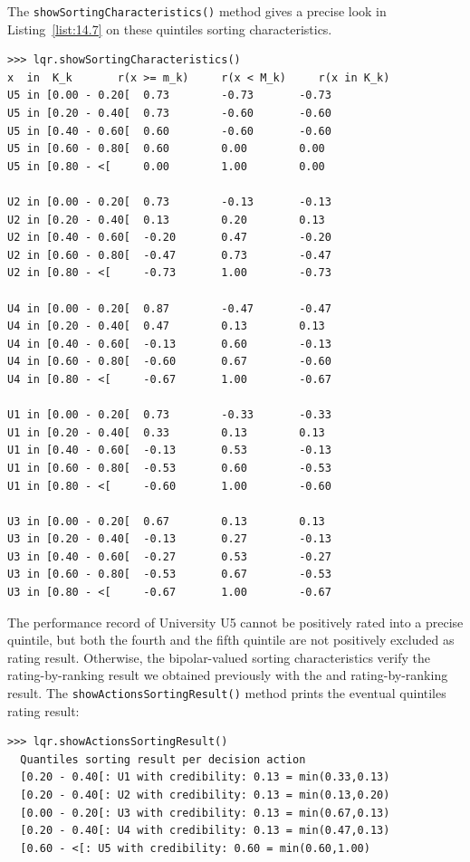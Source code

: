 The \texttt{showSortingCharacteristics()} method gives a precise look in Listing~\vref{list:14.7} on these quintiles sorting characteristics.
\begin{lstlisting}[caption={Showing quantiles sorting characteristics},label=list:14.7,basicstyle=\ttfamily\scriptsize]
>>> lqr.showSortingCharacteristics()
x  in  K_k	     r(x >= m_k)     r(x < M_k)	    r(x in K_k)
U5 in [0.00 - 0.20[	 0.73		 -0.73		 -0.73
U5 in [0.20 - 0.40[	 0.73		 -0.60		 -0.60
U5 in [0.40 - 0.60[	 0.60		 -0.60		 -0.60
U5 in [0.60 - 0.80[	 0.60		 0.00		 0.00
U5 in [0.80 - <[	 0.00		 1.00		 0.00

U2 in [0.00 - 0.20[	 0.73		 -0.13		 -0.13
U2 in [0.20 - 0.40[	 0.13		 0.20		 0.13
U2 in [0.40 - 0.60[	 -0.20		 0.47		 -0.20
U2 in [0.60 - 0.80[	 -0.47		 0.73		 -0.47
U2 in [0.80 - <[	 -0.73		 1.00		 -0.73

U4 in [0.00 - 0.20[	 0.87		 -0.47		 -0.47
U4 in [0.20 - 0.40[	 0.47		 0.13		 0.13
U4 in [0.40 - 0.60[	 -0.13		 0.60		 -0.13
U4 in [0.60 - 0.80[	 -0.60		 0.67		 -0.60
U4 in [0.80 - <[	 -0.67		 1.00		 -0.67

U1 in [0.00 - 0.20[	 0.73		 -0.33		 -0.33
U1 in [0.20 - 0.40[	 0.33		 0.13		 0.13
U1 in [0.40 - 0.60[	 -0.13		 0.53		 -0.13
U1 in [0.60 - 0.80[	 -0.53		 0.60		 -0.53
U1 in [0.80 - <[	 -0.60		 1.00		 -0.60

U3 in [0.00 - 0.20[	 0.67		 0.13		 0.13
U3 in [0.20 - 0.40[	 -0.13		 0.27		 -0.13
U3 in [0.40 - 0.60[	 -0.27		 0.53		 -0.27
U3 in [0.60 - 0.80[	 -0.53		 0.67		 -0.53
U3 in [0.80 - <[	 -0.67		 1.00		 -0.67
\end{lstlisting}

The performance record of University U5 cannot be positively rated into a precise quintile, but both the fourth and the fifth quintile are not positively excluded as rating result. Otherwise, the bipolar-valued sorting characteristics verify the rating-by-ranking result we obtained previously with the \Kemeny and \Copeland rating-by-ranking result. 
The \texttt{showActionsSortingResult()} method prints the eventual quintiles rating result:
\begin{lstlisting}[caption={Showing a quintiles rating-by-sorting result},label=list:14.8]
>>> lqr.showActionsSortingResult()
  Quantiles sorting result per decision action
  [0.20 - 0.40[: U1 with credibility: 0.13 = min(0.33,0.13)
  [0.20 - 0.40[: U2 with credibility: 0.13 = min(0.13,0.20)
  [0.00 - 0.20[: U3 with credibility: 0.13 = min(0.67,0.13)
  [0.20 - 0.40[: U4 with credibility: 0.13 = min(0.47,0.13)
  [0.60 - <[: U5 with credibility: 0.60 = min(0.60,1.00)
\end{lstlisting}

